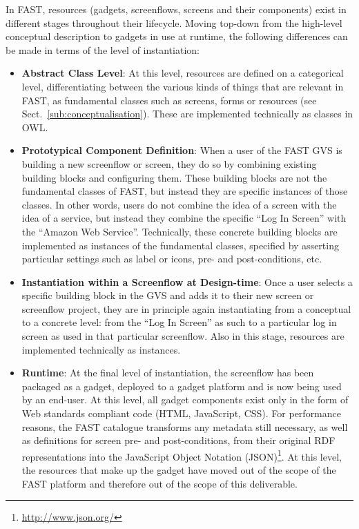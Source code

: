 \documentclass[twoside]{fast_latex}
\begin{document}
In FAST, resources (gadgets, screenflows, screens and their components) exist in different stages throughout their lifecycle. Moving top-down from the high-level conceptual description to gadgets in use at runtime, the following differences can be made in terms of the level of instantiation:

\begin{itemize}
	\item \textbf{Abstract Class Level}: At this level, resources are defined on a categorical level, differentiating between the various kinds of things that are relevant in FAST, as fundamental classes such as screens, forms or resources (see Sect.~\ref{sub:conceptualisation}). These are implemented technically as classes in OWL.
	\item \textbf{Prototypical Component Definition}: When a user of the FAST GVS is building a new screenflow or screen, they do so by combining existing building blocks and configuring them. These building blocks are not the fundamental classes of FAST, but instead they are specific instances of those classes. In other words, users do not combine the idea of a screen with the idea of a service, but instead they combine the specific ``Log In Screen'' with the ``Amazon Web Service''. Technically, these concrete building blocks are implemented as instances of the fundamental classes, specified by asserting particular settings such as label or icons, pre- and post-conditions, etc.
	\item \textbf{Instantiation within a Screenflow at Design-time}: Once a user selects a specific building block in the GVS and adds it to their new screen or screenflow project, they are in principle again instantiating from a conceptual to a concrete level: from the ``Log In Screen'' as such to a particular log in screen as used in that particular screenflow. Also in this stage, resources are implemented technically as instances.
	\item \textbf{Runtime}: At the final level of instantiation, the screenflow has been packaged as a gadget, deployed to a gadget platform and is now being used by an end-user. At this level, all gadget components exist only in the form of Web standards compliant code (HTML, JavaScript, CSS). For performance reasons, the FAST catalogue transforms any metadata still necessary, as well as definitions for screen pre- and post-conditions, from their original RDF representations into the JavaScript Object Notation (JSON)\footnote{\url{http://www.json.org/}}. At this level, the resources that make up the gadget have moved out of the scope of the FAST platform and therefore out of the scope of this deliverable.
\end{itemize}
\end{document}
